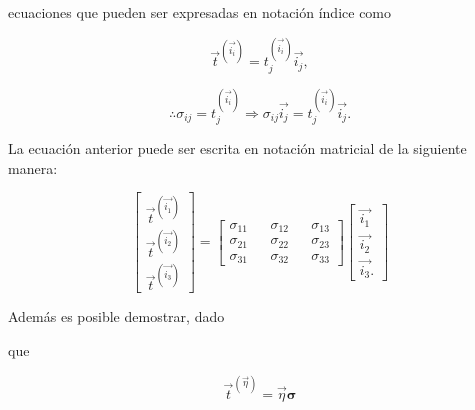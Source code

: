\documentclass{article}
\begin{document}
    ecuaciones que pueden ser expresadas en notaci\'{o}n \'{i}ndice como

    \begin{equation}
        \vec{t}^{(\vec{i_{i}})} = t_{j}^{(\vec{i_{i}})}\vec{i_{j}},
    \end{equation}

    \begin{equation}
        \therefore \sigma_{ij} = t_{j}^{(\vec{i_{i}})} \Longrightarrow 
        \sigma_{ij}\vec{i_{j}} = t_{j}^{(\vec{i_{i}})}\vec{i_{j}}.
    \end{equation}

    La ecuaci\'{o}n anterior puede ser escrita en notaci\'{o}n matricial de la siguiente manera:

    \begin{equation}
        \begin{bmatrix}
            \vec{t}^{(\vec{i_{1}})} \\
            \vec{t}^{(\vec{i_{2}})} \\
            \vec{t}^{(\vec{i_{3}})}
        \end{bmatrix}
        =
        \begin{bmatrix}
            \sigma_{11} && \sigma_{12} && \sigma_{13} \\
            \sigma_{21} && \sigma_{22} && \sigma_{23} \\
            \sigma_{31} && \sigma_{32} && \sigma_{33}
        \end{bmatrix}
        \begin{bmatrix}
            \vec{i_{1}} \\
            \vec{i_{2}} \\
            \vec{i_{3}}.
        \end{bmatrix}
    \end{equation}

    Adem\'{a}s es posible demostrar, dado


    que

    \begin{equation}
        \vec{t}^{(\vec{\eta})} = \vec{\eta}\bm{\sigma}
    \end{equation}

\end{document}
